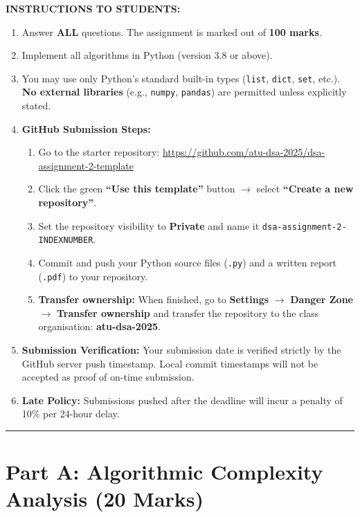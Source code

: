 \documentclass[11pt,a4paper]{article}
\begin{document}
\noindent
\textbf{INSTRUCTIONS TO STUDENTS:}
\begin{enumerate}
    \item Answer \textbf{ALL} questions. The assignment is marked out of \textbf{100 marks}.
    \item Implement all algorithms in Python (version 3.8 or above).
    \item You may use only Python's standard built-in types (\texttt{list}, \texttt{dict}, \texttt{set}, etc.).
          \textbf{No external libraries} (e.g., \texttt{numpy}, \texttt{pandas}) are permitted unless explicitly stated.
    \item \textbf{GitHub Submission Steps:}
    \begin{enumerate}
        \item Go to the starter repository: \url{https://github.com/atu-dsa-2025/dsa-assignment-2-template}
        \item Click the green \textbf{``Use this template''} button $\rightarrow$ select \textbf{``Create a new repository''}.
        \item Set the repository visibility to \textbf{Private} and name it \texttt{dsa-assignment-2-INDEXNUMBER}.
        \item Commit and push your Python source files (\texttt{.py}) and a written report (\texttt{.pdf}) to your repository.
        \item \textbf{Transfer ownership:} When finished, go to \textbf{Settings} $\rightarrow$ \textbf{Danger Zone} $\rightarrow$ \textbf{Transfer ownership} and transfer the repository to the class organisation: \textbf{atu-dsa-2025}.
    \end{enumerate}
    \item \textbf{Submission Verification:} Your submission date is verified strictly by the GitHub server push timestamp. Local commit timestamps will not be accepted as proof of on-time submission.
    \item \textbf{Late Policy:} Submissions pushed after the deadline will incur a penalty of 10\% per 24-hour delay.
\end{enumerate}

\vspace{0.3cm}
\hrule
\vspace{0.5cm}

\section{Part A: Algorithmic Complexity Analysis (20 Marks)}
\end{document}
